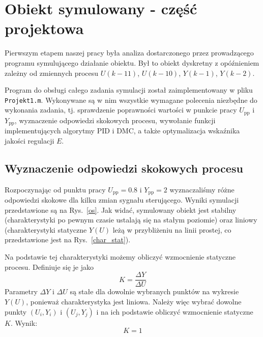 \chapter{Obiekt symulowany - część projektowa}
Pierwszym etapem naszej pracy była analiza dostarczonego przez prowadzącego programu symulującego działanie obiektu. Był to obiekt dyskretny z opóźnieniem zależny od zmiennych procesu $U(k-11)$, $U(k-10)$, $Y(k-1)$, $Y(k-2)$.

Program do obsługi całego zadania symulacji został zaimplementowany w pliku \texttt{Projekt1.m}. Wykonywane są w nim wszystkie wymagane polecenia niezbędne do wykonania zadania, tj. sprawdzenie poprawności wartości w punkcie pracy $U_{\mathrm{pp}}$ i $Y_{\mathrm{pp}}$, wyznaczenie odpowiedzi skokowych procesu, wywołanie funkcji implementujących algorytmy PID i DMC, a także optymalizacja wskaźnika jakości regulacji $E$.

\section{Wyznaczenie odpowiedzi skokowych procesu}
Rozpoczynając od punktu pracy $U_{\mathrm{pp}}=\num{0,8}$ i $Y_{\mathrm{pp}}=2$ wyznaczaliśmy różne odpowiedzi skokowe dla kilku zmian sygnału sterującego. Wyniki symulacji przedstawione są na Rys.~\ref{os}. Jak widać, symulowany obiekt jest stabilny (charakterystyki po pewnym czasie ustalają się na stałym poziomie) oraz liniowy (charakterystyki statyczne $Y(U)$ leżą w przybliżeniu na linii prostej, co przedstawione jest na Rys.~\ref{char_stat}).

Na podstawie tej charakterystyki możemy obliczyć wzmocnienie statyczne procesu. Definiuje się je jako
\begin{equation}
K=\frac{\Delta Y}{\Delta U}
\end{equation}
Parametry $\Delta Y$ i $\Delta U$ są stałe dla dowolnie wybranych punktów na wykresie $Y(U)$, ponieważ charakterystyka jest liniowa. Należy więc wybrać dowolne punkty $(U_i, Y_i)$ i $(U_j, Y_j)$ i na ich podstawie obliczyć wzmocnienie statyczne $K$. Wynik:
\begin{equation}
K=1
\end{equation}

